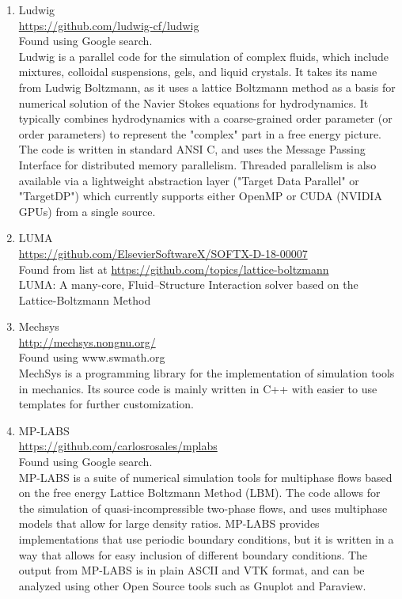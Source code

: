 \documentclass{article}
\begin{document}
\begin{enumerate}
\item Ludwig
\\
\href{https://github.com/ludwig-cf/ludwig}{https://github.com/ludwig-cf/ludwig}\\
Found using Google search.\\
Ludwig is a parallel code for the simulation of complex fluids, which include mixtures, colloidal suspensions, gels, and liquid crystals. It takes its name from Ludwig Boltzmann, as it uses a lattice Boltzmann method as a basis for numerical solution of the Navier Stokes equations for hydrodynamics. It typically combines hydrodynamics with a coarse-grained order parameter (or order parameters) to represent the "complex" part in a free energy picture. The code is written in standard ANSI C, and uses the Message Passing Interface for distributed memory parallelism. Threaded parallelism is also available via a lightweight abstraction layer ("Target Data Parallel" or "TargetDP") which currently supports either OpenMP or CUDA (NVIDIA GPUs) from a single source.

\item LUMA
\\
\href{https://github.com/ElsevierSoftwareX/SOFTX-D-18-00007}{https://github.com/ElsevierSoftwareX/SOFTX-D-18-00007}\\
Found from list at \href{https://github.com/topics/lattice-boltzmann}{https://github.com/topics/lattice-boltzmann}\\
LUMA: A many-core, Fluid–Structure Interaction solver based on the Lattice-Boltzmann Method

\item Mechsys \\
\href{http://mechsys.nongnu.org/}{http://mechsys.nongnu.org/}\\
Found using www.swmath.org \\
MechSys is a programming library for the implementation of simulation tools in mechanics. Its source code is mainly written in C++ with easier to use templates for further customization.

\item MP-LABS
\\
\href{https://github.com/carlosrosales/mplabs}{https://github.com/carlosrosales/mplabs}
\\
Found using Google search.\\
MP-LABS is a suite of numerical simulation tools for multiphase flows based on the free energy Lattice Boltzmann Method (LBM). The code allows for the simulation of quasi-incompressible two-phase flows, and uses multiphase models that allow for large density ratios. MP-LABS provides implementations that use periodic boundary conditions, but it is written in a way that allows for easy inclusion of different boundary conditions. The output from MP-LABS is in plain ASCII and VTK format, and can be analyzed using other Open Source tools such as Gnuplot and Paraview.


\end{enumerate}
\end{document}
